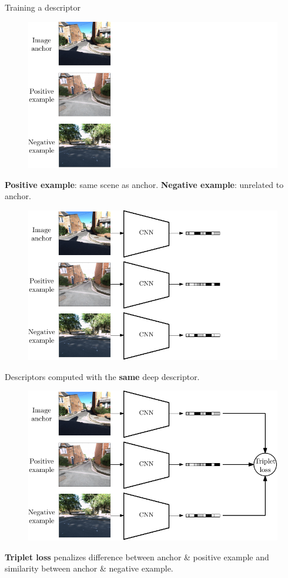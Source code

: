 \begin{frame}{Training a descriptor}
	\only<1>
	{
	\begin{figure}
	\centering
	\includegraphics[width=0.7\linewidth]{vect/method/fig2/1}
	\end{figure}
	\vfill
	\textbf{Positive example}: same scene as anchor. \textbf{Negative example}: unrelated to anchor.
	}
	{
	\begin{figure}
	\centering
	\includegraphics[width=0.7\linewidth]{vect/method/fig2/2}	
	\end{figure}	
	\vfill
	Descriptors computed with the \textbf{same}	deep descriptor.
	}
	{
	\begin{figure}
	\centering
	\includegraphics[width=0.7\linewidth]{vect/method/fig2/3}
	\end{figure}	
	\vfill
	\textbf{Triplet loss} penalizes difference between anchor \& positive example and similarity between anchor \& negative example.
	}
\end{frame}


